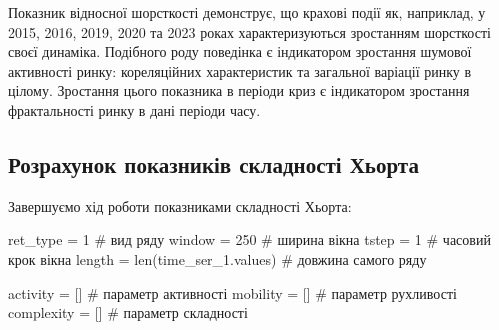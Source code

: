 \documentclass[
  letterpaper,
]{report}
\newenvironment{Shaded}{\begin{snugshade}}{\end{snugshade}}
\newcommand{\BuiltInTok}[1]{\textcolor[rgb]{0.00,0.23,0.31}{#1}}
\newcommand{\CommentTok}[1]{\textcolor[rgb]{0.37,0.37,0.37}{#1}}
\newcommand{\DecValTok}[1]{\textcolor[rgb]{0.68,0.00,0.00}{#1}}
\newcommand{\NormalTok}[1]{\textcolor[rgb]{0.00,0.23,0.31}{#1}}
\newcommand{\OperatorTok}[1]{\textcolor[rgb]{0.37,0.37,0.37}{#1}}
\begin{document}
Показник відносної шорсткості демонструє, що крахові події як,
наприклад, у 2015, 2016, 2019, 2020 та 2023 роках характеризуються
зростанням шорсткості своєї динаміка. Подібного роду поведінка є
індикатором зростання шумової активності ринку: кореляційних
характеристик та загальної варіації ринку в цілому. Зростання цього
показника в періоди криз є індикатором зростання фрактальності ринку в
дані періоди часу.

\hypertarget{ux440ux43eux437ux440ux430ux445ux443ux43dux43eux43a-ux43fux43eux43aux430ux437ux43dux438ux43aux456ux432-ux441ux43aux43bux430ux434ux43dux43eux441ux442ux456-ux445ux44cux43eux440ux442ux430}{%
\subsection{Розрахунок показників складності
Хьорта}\label{ux440ux43eux437ux440ux430ux445ux443ux43dux43eux43a-ux43fux43eux43aux430ux437ux43dux438ux43aux456ux432-ux441ux43aux43bux430ux434ux43dux43eux441ux442ux456-ux445ux44cux43eux440ux442ux430}}

Завершуємо хід роботи показниками складності Хьорта:

\begin{Shaded}
\begin{Highlighting}[]
\NormalTok{ret\_type }\OperatorTok{=} \DecValTok{1}                      \CommentTok{\# вид ряду}
\NormalTok{window }\OperatorTok{=} \DecValTok{250}                      \CommentTok{\# ширина вікна}
\NormalTok{tstep }\OperatorTok{=} \DecValTok{1}                         \CommentTok{\# часовий крок вікна }
\NormalTok{length }\OperatorTok{=} \BuiltInTok{len}\NormalTok{(time\_ser\_1.values)   }\CommentTok{\# довжина самого ряду }

\NormalTok{activity }\OperatorTok{=}\NormalTok{ []                     }\CommentTok{\# параметр активності}
\NormalTok{mobility }\OperatorTok{=}\NormalTok{ []                     }\CommentTok{\# параметр рухливості}
\NormalTok{complexity }\OperatorTok{=}\NormalTok{ []                   }\CommentTok{\# параметр складності}
\end{Highlighting}
\end{Shaded}
\end{document}
